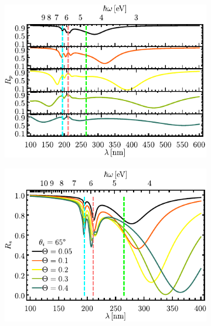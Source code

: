 \begin{figure}[b!]\centering\hspace*{-1.5em}
	\begin{subfigure}{.01\linewidth}\caption{}\label{sfig:R-ATR10-cutp}\vspace{4.5cm}\end{subfigure}
	\begin{subfigure}{.45\linewidth}\hspace*{-1.5em}
	\includegraphics[scale=1]{2-Resultados/figs/2-Wp10ThetaVar/cut_angle_65_p_Stack.pdf}\end{subfigure}
	\begin{subfigure}{.01\linewidth}\caption{}\label{sfig:R-ATR10-cuts}\vspace{4.5cm}\end{subfigure}\hspace*{-1.em}
	\begin{subfigure}{.45\linewidth}\centering
	\includegraphics[scale=1 ]{2-Resultados/figs/2-Wp10ThetaVar/cut_angle_65_s.pdf}\end{subfigure}\vspace*{-.7em}

\end{figure}
